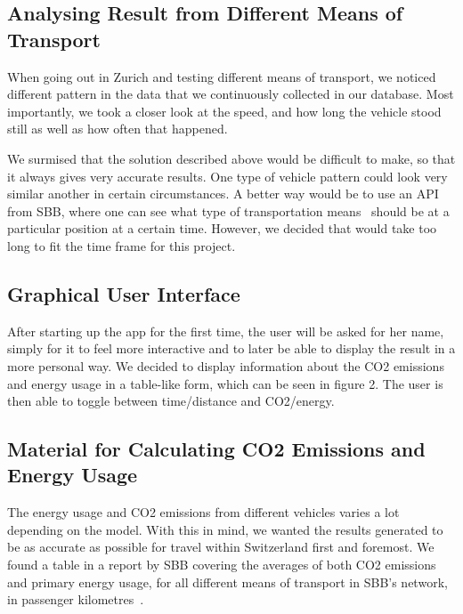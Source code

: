 \documentclass[10pt,conference,compsocconf]{IEEEtran}
\begin{document}
\subsection{Analysing Result from Different Means of Transport}

When going out in Zurich and testing different means of transport, we noticed different pattern in the data that we continuously collected in our database. Most importantly, we took a closer look at the speed, and how long the vehicle stood still as well as how often that happened. 

We surmised that the solution described above would be difficult to make, so that it always gives very accurate results. One type of vehicle pattern could look very similar another in certain circumstances. A better way would be to use an API from SBB, where one can see what type of transportation means  should be at a particular position at a certain time. However, we decided that would take too long to fit the time frame for this project.



\subsection{Graphical User Interface}

After starting up the app for the first time, the user will be asked for her name, simply for it to feel more interactive and to later be able to display the result in a more personal way.
We decided to display information about the CO2 emissions and energy usage in a table-like form, which can be seen in figure 2. The user is then able to toggle between time/distance and CO2/energy.


\subsection{Material for Calculating CO2 Emissions and Energy Usage}

The energy usage and CO2 emissions from different vehicles varies a lot depending on the model. With this in mind, we wanted the results generated to be as accurate as possible for travel within Switzerland first and foremost. We found a table in a report by SBB covering the averages of both CO2 emissions and primary energy usage, for all different means of transport in SBB’s network, in passenger kilometres~\cite{sbbcalculator2017}.
\end{document}
